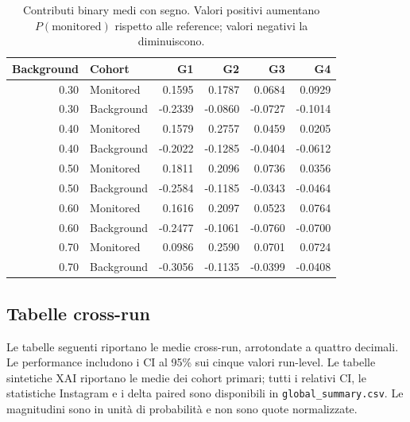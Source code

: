 \documentclass[11pt,a4paper]{article}
\begin{document}
\begin{table}[htbp]
\centering\small
\caption{Contributi binary medi con segno. Valori positivi aumentano $P(\mathrm{monitored})$ rispetto alle reference; valori negativi la diminuiscono.}
\label{tab:open-binary-signed}
\begin{tabular}{rlrrrr}
\toprule
Background & Cohort & G1 & G2 & G3 & G4 \\
\midrule
0.30 & Monitored & 0.1595 & 0.1787 & 0.0684 & 0.0929 \\
0.30 & Background & -0.2339 & -0.0860 & -0.0727 & -0.1014 \\
0.40 & Monitored & 0.1579 & 0.2757 & 0.0459 & 0.0205 \\
0.40 & Background & -0.2022 & -0.1285 & -0.0404 & -0.0612 \\
0.50 & Monitored & 0.1811 & 0.2096 & 0.0736 & 0.0356 \\
0.50 & Background & -0.2584 & -0.1185 & -0.0343 & -0.0464 \\
0.60 & Monitored & 0.1616 & 0.2097 & 0.0523 & 0.0764 \\
0.60 & Background & -0.2477 & -0.1061 & -0.0760 & -0.0700 \\
0.70 & Monitored & 0.0986 & 0.2590 & 0.0701 & 0.0724 \\
0.70 & Background & -0.3056 & -0.1135 & -0.0399 & -0.0408 \\
\bottomrule
\end{tabular}
\end{table}



\clearpage
\subsection{Tabelle cross-run}
Le tabelle seguenti riportano le medie cross-run, arrotondate a quattro decimali. Le performance includono i CI al 95\% sui cinque valori run-level. Le tabelle sintetiche XAI riportano le medie dei cohort primari; tutti i relativi CI, le statistiche Instagram e i delta paired sono disponibili in \texttt{global\_summary.csv}. Le magnitudini sono in unità di probabilità e non sono quote normalizzate.
\end{document}
